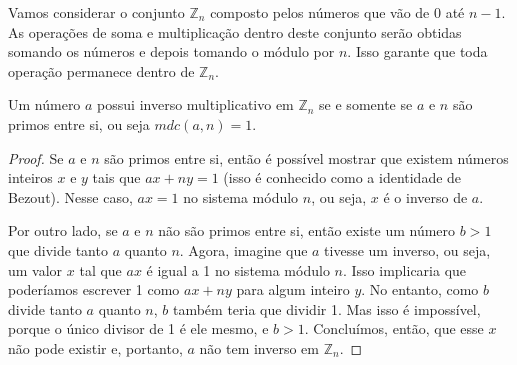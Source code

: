 Vamos considerar o conjunto $\mathbb{Z}_n$ composto pelos números que vão de $0$ até $n-1$.
As operações de soma e multiplicação dentro deste conjunto serão obtidas somando os números e depois tomando o módulo por $n$.
Isso garante que toda operação permanece dentro de $\mathbb{Z}_n$.

\begin{proposition}
\label{prop:inverso}
Um número $a$ possui inverso multiplicativo em $\mathbb{Z}_n$ se e somente se $a$ e $n$ são primos entre si, ou seja $mdc(a,n) = 1$.
\end{proposition}
\begin{proof}

Se $a$ e $n$ são primos entre si, então é possível mostrar que existem números inteiros $x$ e $y$ tais que $ax + ny = 1$ (isso é conhecido como a identidade de Bezout).
Nesse caso, $ax = 1$ no sistema módulo $n$, ou seja, $x$ é o inverso de $a$.

Por outro lado, se $a$ e $n$ não são primos entre si, então existe um número $b > 1$ que divide tanto $a$ quanto $n$.
Agora, imagine que $a$ tivesse um inverso, ou seja, um valor $x$ tal que $ax$ é igual a 1 no sistema módulo $n$.
Isso implicaria que poderíamos escrever 1 como $ax + ny$ para algum inteiro $y$.
No entanto, como $b$ divide tanto $a$ quanto $n$, $b$ também teria que dividir 1.
Mas isso é impossível, porque o único divisor de 1 é ele mesmo, e $b > 1$. Concluímos, então, que esse $x$ não pode existir e, portanto, $a$ não tem inverso em $\mathbb{Z}_n$.
\end{proof}


